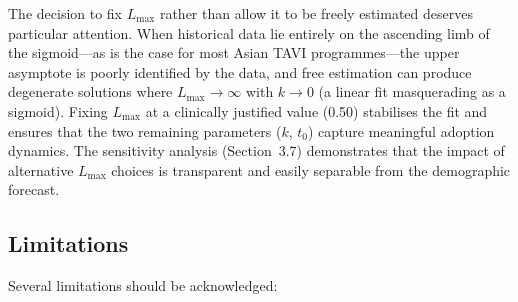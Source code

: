 \documentclass[12pt, a4paper]{article}
\begin{document}
The decision to fix $L_{\max}$ rather than allow it to be freely estimated deserves particular attention. When historical data lie entirely on the ascending limb of the sigmoid---as is the case for most Asian TAVI programmes---the upper asymptote is poorly identified by the data, and free estimation can produce degenerate solutions where $L_{\max} \to \infty$ with $k \to 0$ (a linear fit masquerading as a sigmoid). Fixing $L_{\max}$ at a clinically justified value (0.50) stabilises the fit and ensures that the two remaining parameters ($k$, $t_0$) capture meaningful adoption dynamics. The sensitivity analysis (Section~3.7) demonstrates that the impact of alternative $L_{\max}$ choices is transparent and easily separable from the demographic forecast.

\subsection{Limitations}

Several limitations should be acknowledged:
\end{document}
